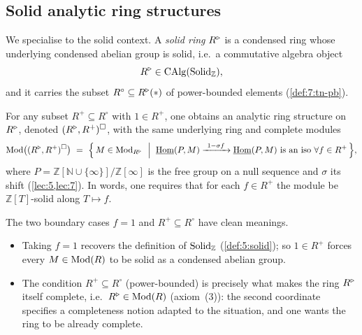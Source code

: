 \subsection{Solid analytic ring structures}

We specialise to the solid context. A \emph{solid ring} $R^{\triangleright}$ is a condensed
ring whose underlying condensed abelian group is solid, i.e.\ a commutative
algebra object
\begin{equation*}
R^{\triangleright}\in\operatorname{CAlg}(\mathrm{Solid}_{\mathbb{Z}}),
\end{equation*}
and it carries the subset $R^{\circ}\subseteq R^{\triangleright}(\ast)$ of power-bounded
elements (\cref{def:7:tn-pb}).

\begin{definition}
\label{def:9:solid-structure}
For any subset $R^{+}\subseteq R^{\circ}$ with $1\in R^{+}$, one obtains an
analytic ring structure on $R^{\triangleright}$, denoted $(R^{\triangleright},R^{+})^{\square}$, with the
same underlying ring and complete modules
\begin{equation}
\label{eq:9:solid-mod}
\Mod\bigl((\ur R,R^{+})^{\solid}\bigr)\ =\ \Bigl\{\, M\in\Mod_{\ur R}\ \Bigm|\
\iHom(P,M)\xrightarrow{\ 1-\sigma f\ }\iHom(P,M)\ \text{is an iso}\ \forall f\in
R^{+}\,\Bigr\},
\end{equation}
where $P=\mathbb{Z}[\mathbb{N}\cup\{\infty\}]/\mathbb{Z}[\infty]$ is the free
group on a null sequence and $\sigma$ its shift (\cref{lec:5,lec:7}). In words,
one requires that for each $f\in R^{+}$ the module be $\mathbb{Z}[T]$-solid
along $T\mapsto f$.
\end{definition}

\begin{remark}
\label{rmk:9:reading-conditions}
The two boundary cases $f=1$ and $R^{+}\subseteq R^{\circ}$ have clean meanings.
\begin{itemize}
\item Taking $f=1$ recovers the definition of $\mathrm{Solid}_{\mathbb{Z}}$
(\cref{def:5:solid}); so $1\in R^{+}$ forces every $M\in\operatorname{Mod}(R)$ to be solid as
a condensed abelian group.
\item The condition $R^{+}\subseteq R^{\circ}$ (power-bounded) is precisely what
makes the ring $R^{\triangleright}$ itself complete, i.e.\ $R^{\triangleright}\in\operatorname{Mod}(R)$ (axiom~(3)):
the second coordinate specifies a completeness notion adapted to the situation,
and one wants the ring to be already complete.
\end{itemize}
\end{remark}

